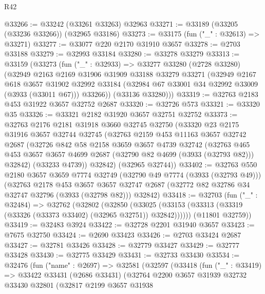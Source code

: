 \begin{lexlean}{R42}
\begin{coremodule}
@33266 := @33242 (@33261 @33263) @32963
@33271 := @33189 (@33205 (@33236 @33266)) (@32965 @33186)
@33273 := @33175 (fun ("_" : @32613) => @33271)
@33277 := @33077 @220 @2170 @31910 @3657
@33278 := @2703 @33188
@33279 := @32993 @33184
@33280 := @33278 @33279
@33313 := @33159
    (@33273
      (fun ("_" : @32933) =>
      @33277
        @33280
        (@2728 @33280)
        (@32949
          @2163
          @2169
          @31906
          @31909
          @33188
          @33279
          @33271
          (@32949
            @2167
            @618
            @3657
            @31902
            @32992
            @33184
            (@32984 @67 @33001 @34 @32992 @33009 (@3933 (@33011 @67)))
            @33266))
        (@33136 @33280)))
@33319 := @32763 @2183 @453 @31922 @3657 @32752 @2687
@33320 := @32726 @573
@33321 := @33320 @35
@33326 := @33321 @2182 @31920 @3657 @32751 @32752
@33373 := @32763
    @2176
    @2181
    @31918
    @3660
    @32745
    @32750
    (@33320
      @23
      @2175
      @31916
      @3657
      @32744
      @32745
      (@32763
        @2159
        @453
        @11163
        @3657
        @32742
        @2687
        (@32726
          @842
          @58
          @2158
          @3659
          @3657
          @4739
          @32742
          (@32763 @465 @453 @3657 @3657 @4699 @2687 (@32790 @82 @4699 (@3933 (@32793 @82))) @32842)
          (@33233 @4739))
        @32842)
      (@32965 @32744))
@33402 := @32763
    @550
    @2180
    @3657
    @3659
    @7774
    @32749
    (@32790 @49 @7774 (@3933 (@32793 @49)))
    (@32763
      @2178
      @453
      @3657
      @3657
      @32747
      @2687
      (@32772 @82 @32786 @34 @32747 @32796 (@3933 (@32798 @82)))
      @32842)
@33418 := @32703
    (fun ("_" : @32484) =>
    @32762
      (@32802
        (@32850
          (@33025 (@33153 (@33313 (@33319 (@33326 (@33373 @33402) (@32965 @32751)) @32842))))))
      (@11801 @32759))
@33419 := @32483 @3924
@33422 := @32728 @2201 @31940 @3657
@33423 := @7675 @32750
@33424 := @2690 @33423
@33426 := @2703 @33424 @2687
@33427 := @32781 @33426
@33428 := @32779 @33427
@33429 := @32777 @33428
@33430 := @32775 @33429
@33431 := @32733 @33430
@33534 := @32476
    (fun ("name" : @2697) =>
    @32581
      (@32597
        (@33418
          (fun ("_" : @33419) =>
          @33422
            @33431
            (@2686 @33431)
            (@32764
              @2200
              @3657
              @31939
              @32732
              @33430
              @32801
              (@32817
                @2199
                @3657
                @31938

\end{coremodule}
\end{lexlean}

